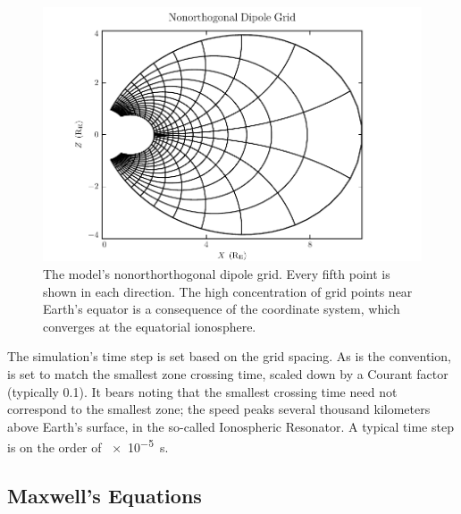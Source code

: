 \begin{figure}[!htb]
    \centering
    \includegraphics[width=\textwidth]{figures/grid.pdf}
    \caption[Nonorthogonal Dipole Grid]{
      The model's nonorthorthogonal dipole grid. Every fifth point is shown in each direction. The high concentration of grid points near Earth's equator is a consequence of the coordinate system, which converges at the equatorial ionosphere. 
    }
    \label{fig_grid}
\end{figure}

The simulation's time step is set based on the grid spacing. As is the convention, \dt is set to match the smallest \Alfven zone crossing time, scaled down by a Courant factor (typically 0.1). It bears noting that the smallest crossing time need not correspond to the smallest zone; the \Alfven speed peaks several thousand kilometers above Earth's surface, in the so-called Ionospheric \Alfven Resonator\cite{lysak_2013}. A typical time step is on the order of \SI{e-5}{\second}. 


















\subsection{Maxwell's Equations}
  \label{sec_eqns}

